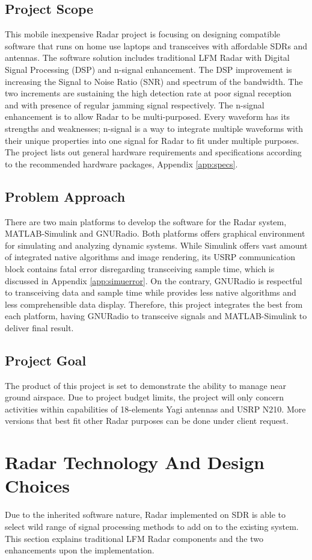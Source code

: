 \documentclass[twocolumn]{IEEEtran} %
\begin{document}
\subsection{Project Scope}
This mobile inexpensive Radar project is focusing on designing compatible software that runs on home use laptops and transceives with affordable SDRs and antennas. The software solution includes traditional LFM Radar with Digital Signal Processing (DSP) and n-signal enhancement. The DSP improvement is increasing the Signal to Noise Ratio (SNR) and spectrum of the bandwidth. The two increments are sustaining the high detection rate at poor signal reception and with presence of regular jamming signal respectively. The n-signal enhancement is to allow Radar to be multi-purposed. Every waveform has its strengths and weaknesses; n-signal is a way to integrate multiple waveforms with their unique properties into one signal for Radar to fit under multiple purposes. The project lists out general hardware requirements and specifications according to the recommended hardware packages, Appendix \ref{app:specs}. 
\subsection{Problem Approach}
There are two main platforms to develop the software for the Radar system, MATLAB-Simulink and GNURadio. Both platforms offers graphical environment for simulating and analyzing dynamic systems. While Simulink offers vast amount of integrated native algorithms and image rendering, its USRP communication block contains fatal error disregarding transceiving sample time, which is discussed in Appendix \ref{app:simuerror}. On the contrary, GNURadio is respectful to transceiving data and sample time while provides less native algorithms and less comprehensible data display. Therefore, this project integrates the best from each platform, having GNURadio to transceive signals and MATLAB-Simulink to deliver final result. 
\subsection{Project Goal}
The product of this project is set to demonstrate the ability to manage near ground airspace. Due to project budget limits, the project will only concern activities within capabilities of 18-elements Yagi antennas and USRP N210. More versions that best fit other Radar purposes can be done under client request. 


\section{Radar Technology And Design Choices}
Due to the inherited software nature, Radar implemented on SDR is able to select wild range of signal processing methods to add on to the existing system. This section explains traditional LFM Radar components and the two enhancements upon the implementation.
\end{document}
